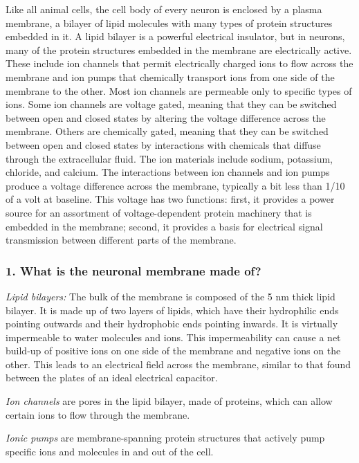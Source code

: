Like all animal cells, the cell body of every neuron is enclosed by a plasma membrane, a bilayer of lipid molecules with many types of protein structures embedded in it. A lipid bilayer is a powerful electrical insulator, but in neurons, many of the protein structures embedded in the membrane are electrically active. These include ion channels that permit electrically charged ions to flow across the membrane and ion pumps that chemically transport ions from one side of the membrane to the other. Most ion channels are permeable only to specific types of ions. Some ion channels are voltage gated, meaning that they can be switched between open and closed states by altering the voltage difference across the membrane. Others are chemically gated, meaning that they can be switched between open and closed states by interactions with chemicals that diffuse through the extracellular fluid. The ion materials include sodium, potassium, chloride, and calcium. The interactions between ion channels and ion pumps produce a voltage difference across the membrane, typically a bit less than 1/10 of a volt at baseline. This voltage has two functions: first, it provides a power source for an assortment of voltage-dependent protein machinery that is embedded in the membrane; second, it provides a basis for electrical signal transmission between different parts of the membrane.

\subsubsection{1. What is the neuronal membrane made of?}

\textit{Lipid bilayers:} The bulk of the membrane is composed of the 5 nm thick lipid bilayer. It is made up of two layers of lipids, which have their hydrophilic ends pointing outwards and their hydrophobic ends pointing inwards. It is virtually impermeable to water molecules and ions. This impermeability can cause a net build-up of positive ions on one side of the membrane and negative ions on the other. This leads to an electrical field across the membrane, similar to that found between the plates of an ideal electrical capacitor.

\textit{Ion channels} are pores in the lipid bilayer, made of proteins, which can allow certain ions to flow through the membrane. 

\textit{Ionic pumps} are membrane-spanning protein structures that actively pump specific ions and molecules in and out of the cell. 

